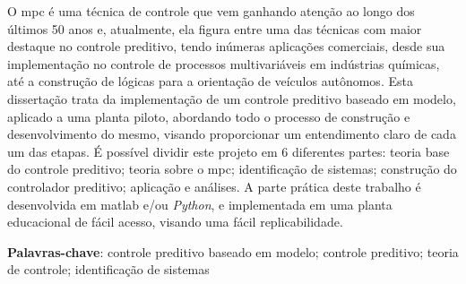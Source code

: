 
\setlength{\absparsep}{18pt} %
\begin{resumo}
    O \acrshort{mpc} é uma técnica de controle que vem ganhando atenção
    ao longo dos últimos 50 anos e, atualmente, ela figura entre uma das técnicas
    com maior destaque no controle preditivo, tendo inúmeras aplicações comerciais,
    desde sua implementação no controle de processos multivariáveis em indústrias químicas,
    até a construção de lógicas para a orientação de veículos autônomos. Esta dissertação
    trata da implementação de um controle preditivo baseado em modelo,
    aplicado a uma planta piloto, abordando todo o processo de construção e desenvolvimento
    do mesmo, visando proporcionar um entendimento claro de cada um das etapas. É possível
    dividir este projeto em 6 diferentes partes: teoria base do controle
    preditivo; teoria sobre o \acrshort{mpc}; identificação de sistemas; construção do
    controlador preditivo; aplicação e análises. A parte prática deste trabalho é
    desenvolvida em \acrshort{matlab} e/ou \textit{Python}, e implementada em uma
    planta educacional de fácil acesso, visando uma fácil replicabilidade.
    
    \vspace{\onelineskip}

    \noindent 
    \textbf{Palavras-chave}: controle preditivo baseado em modelo; controle preditivo; teoria de controle; identificação de sistemas
\end{resumo}